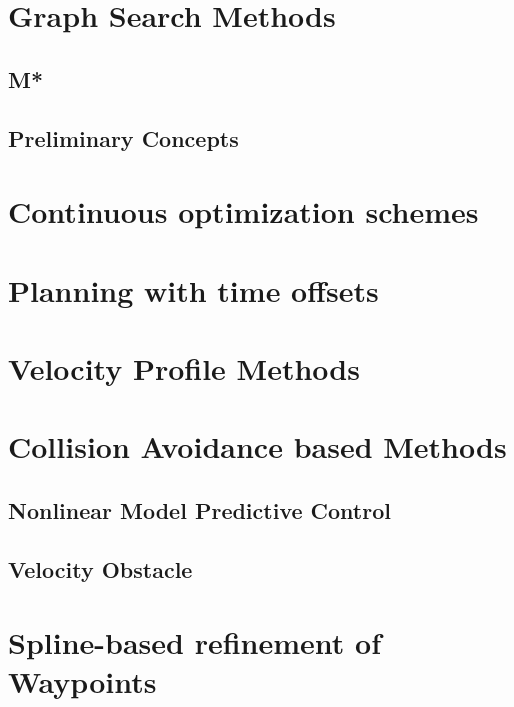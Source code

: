  \section{Graph Search Methods}
 \subsection{M*}
 \subsection{Preliminary Concepts}
 
 \section{Continuous optimization schemes}

 \section{Planning with time offsets}

 \section{Velocity Profile Methods}

 \section{Collision Avoidance based Methods}
 \subsection{Nonlinear Model Predictive Control}
 \subsection{Velocity Obstacle}

 \section{Spline-based refinement of Waypoints}

